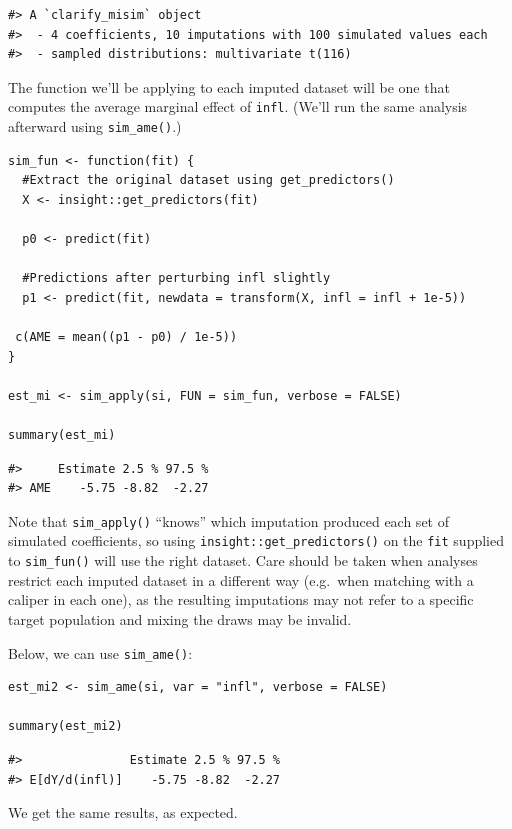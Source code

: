 \begin{verbatim}
#> A `clarify_misim` object
#>  - 4 coefficients, 10 imputations with 100 simulated values each
#>  - sampled distributions: multivariate t(116)
\end{verbatim}

The function we'll be applying to each imputed dataset will be one that computes the average marginal effect of \texttt{infl}. (We'll run the same analysis afterward using \texttt{sim\_ame()}.)

\begin{verbatim}
sim_fun <- function(fit) {
  #Extract the original dataset using get_predictors()
  X <- insight::get_predictors(fit)
  
  p0 <- predict(fit)
  
  #Predictions after perturbing infl slightly
  p1 <- predict(fit, newdata = transform(X, infl = infl + 1e-5))
  
 c(AME = mean((p1 - p0) / 1e-5))
}

est_mi <- sim_apply(si, FUN = sim_fun, verbose = FALSE)

summary(est_mi)
\end{verbatim}

\begin{verbatim}
#>     Estimate 2.5 % 97.5 %
#> AME    -5.75 -8.82  -2.27
\end{verbatim}

Note that \texttt{sim\_apply()} ``knows'' which imputation produced each set of simulated coefficients, so using \texttt{insight::get\_predictors()} on the \texttt{fit} supplied to \texttt{sim\_fun()} will use the right dataset. Care should be taken when analyses restrict each imputed dataset in a different way (e.g.~when matching with a caliper in each one), as the resulting imputations may not refer to a specific target population and mixing the draws may be invalid.

Below, we can use \texttt{sim\_ame()}:

\begin{verbatim}
est_mi2 <- sim_ame(si, var = "infl", verbose = FALSE)

summary(est_mi2)
\end{verbatim}

\begin{verbatim}
#>               Estimate 2.5 % 97.5 %
#> E[dY/d(infl)]    -5.75 -8.82  -2.27
\end{verbatim}

We get the same results, as expected.


